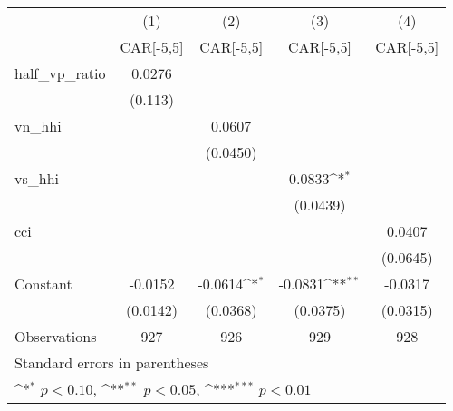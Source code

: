 {
\def\sym#1{\ifmmode^{#1}\else\(^{#1}\)\fi}
\begin{tabular}{l*{4}{c}}
\hline\hline
                    &\multicolumn{1}{c}{(1)}&\multicolumn{1}{c}{(2)}&\multicolumn{1}{c}{(3)}&\multicolumn{1}{c}{(4)}\\
                    &\multicolumn{1}{c}{CAR[-5,5]}&\multicolumn{1}{c}{CAR[-5,5]}&\multicolumn{1}{c}{CAR[-5,5]}&\multicolumn{1}{c}{CAR[-5,5]}\\
\hline
half\_vp\_ratio       &      0.0276         &                     &                     &                     \\
                    &     (0.113)         &                     &                     &                     \\
[1em]
vn\_hhi              &                     &      0.0607         &                     &                     \\
                    &                     &    (0.0450)         &                     &                     \\
[1em]
vs\_hhi              &                     &                     &      0.0833\sym{*}  &                     \\
                    &                     &                     &    (0.0439)         &                     \\
[1em]
cci                 &                     &                     &                     &      0.0407         \\
                    &                     &                     &                     &    (0.0645)         \\
[1em]
Constant            &     -0.0152         &     -0.0614\sym{*}  &     -0.0831\sym{**} &     -0.0317         \\
                    &    (0.0142)         &    (0.0368)         &    (0.0375)         &    (0.0315)         \\
\hline
Observations        &         927         &         926         &         929         &         928         \\
\hline\hline
\multicolumn{5}{l}{\footnotesize Standard errors in parentheses}\\
\multicolumn{5}{l}{\footnotesize \sym{*} \(p<0.10\), \sym{**} \(p<0.05\), \sym{***} \(p<0.01\)}\\
\end{tabular}
}
